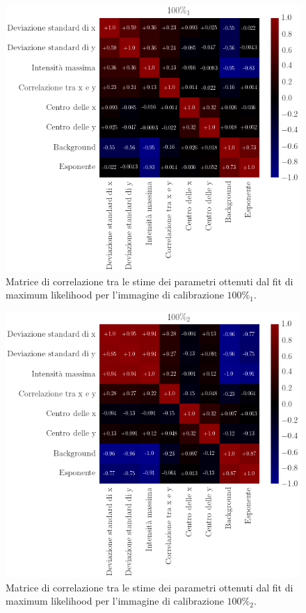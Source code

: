 \begin{figure}
 \centering
 \includegraphics[scale=.45]{img/CAP4c3.png}
 \caption{\small{Matrice di correlazione tra le stime dei parametri ottenuti dal fit di maximum likelihood per l'immagine di calibrazione $100\%_1$.}}
 \label{fig:c3}
\end{figure}

\begin{figure}
 \centering
 \includegraphics[scale=.45]{img/CAP4c4.png}
 \caption{\small{Matrice di correlazione tra le stime dei parametri ottenuti dal fit di maximum likelihood per l'immagine di calibrazione $100\%_2$.}}
 \label{fig:c4}
\end{figure}


